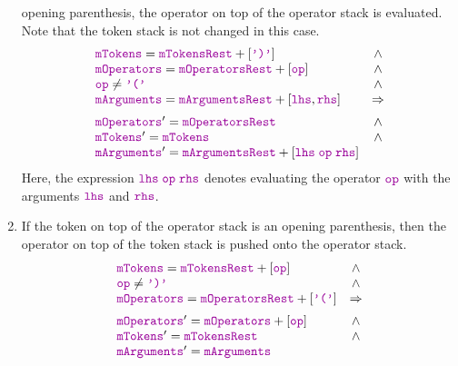\begin{enumerate}
      opening parenthesis,  the operator on top of the operator stack is evaluated.  Note that the token stack
      is not changed in this case. 
    $$\begin{array}{lc}
        \mytt{mTokens} = \mytt{mTokensRest} + [\mytt{')'} ] & \wedge \\
        \mytt{mOperators} = \mytt{mOperatorsRest} + [\mytt{op}] & \wedge \\
        \mytt{op} \not= \mytt{'('} & \wedge \\
        \mytt{mArguments} = \mytt{mArgumentsRest} + [\mytt{lhs}, \mytt{rhs}] & \Rightarrow \\[0.2cm]
        \mytt{mOperators}' = \mytt{mOperatorsRest} & \wedge \\
        \mytt{mTokens}' = \mytt{mTokens} & \wedge \\
        \mytt{mArguments}' = \mytt{mArgumentsRest} + [\mytt{lhs} \;\mytt{op}\; \mytt{rhs}]
        \end{array} 
      $$
      Here, the expression $\mytt{lhs} \;\mytt{op}\; \mytt{rhs}$ denotes evaluating the operator $\mytt{op}$ with the arguments
      $\mytt{lhs}$ and $\mytt{rhs}$.
\item If the token on top of the operator stack is an opening parenthesis, then the operator on top of the token stack
      is pushed onto the operator stack.
    $$\begin{array}{lc}
        \mytt{mTokens} = \mytt{mTokensRest} + [\mytt{op}] & \wedge \\
        \mytt{op} \not= \mytt{')'}                          & \wedge \\
        \mytt{mOperators} = \mytt{mOperatorsRest} + [\mytt{'('}] & \Rightarrow \\[0.2cm]
        \mytt{mOperators}' = \mytt{mOperators} + [\mytt{op}] & \wedge \\
        \mytt{mTokens}' = \mytt{mTokensRest} & \wedge \\
        \mytt{mArguments}' = \mytt{mArguments}
        \end{array} 
      $$
 

\end{enumerate}
